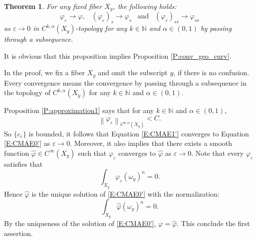 \documentclass{amsart}
\newtheorem{theorem}{Theorem}[section]
\theoremstyle{definition}
\numberwithin{equation}{section}
\begin{document}
\begin{theorem}
For any fixed fiber $X_y$, the following holds:
\begin{equation*}
{\varphi}_{\varepsilon}\rightarrow {\varphi},
\;\;\;
({\varphi}_{\varepsilon})_s\rightarrow {\varphi}_s
\;\;\;
\text{and}
\;\;\;
({\varphi}_{\varepsilon})_{s\bar s}\rightarrow {\varphi}_{s\bar s}
\end{equation*}
as ${\varepsilon}\rightarrow0$ in $C^{k,\alpha}(X_y)$-topology for any $k\in{\mathbb{N}}$ and $\alpha\in(0,1)$ by passing through a subsequence.
\end{theorem}
It is obvious that this proposition implies Proposition \ref{P:conv_geo_curv}. 
\medskip

In the proof, we fix a fiber $X_y$ and omit the subscript $y$, if there is no confusion. Every convergence means the convergence by passing through a subsequence in the topology of $C^{k,\alpha}(X_y)$ for any $k\in{\mathbb{N}}$ and $\alpha\in(0,1)$. 

Proposition \ref{P:approximation1} says that for any $k\in{\mathbb{N}}$ and $\alpha\in(0,1)$, 
\begin{equation*}
{\left\|{{\varphi}_{\varepsilon}}\right\|}_{C^{k,\alpha}(X_y)}<C.
\end{equation*}
So $\{c_{\varepsilon}\}$ is bounded, it follows that Equation \eqref{E:CMAE1'} converges to Equation \eqref{E:CMAE0'} as ${\varepsilon}\rightarrow0$. Moreover, it also implies that there exists a smooth function $\hat{\varphi}\in C^\infty(X_y)$ such that ${\varphi}_{\varepsilon}$ converges to $\hat{\varphi}$ as ${\varepsilon}\rightarrow0$. Note that every ${\varphi}_{\varepsilon}$ satisfies that
\begin{equation*}
\int_{X_y}{\varphi}_{\varepsilon}(\omega_y)^n
=
0.
\end{equation*}
Hence $\hat{\varphi}$ is the unique solution of \eqref{E:CMAE0'} with the normalization:
\begin{equation*}
\int_{X_y}\hat{\varphi}(\omega_y)^n
=
0.
\end{equation*}
By the uniqueness of the solution of \eqref{E:CMAE0'}, ${\varphi}=\hat{\varphi}$. This conclude the first assertion.
\medskip
\end{document}
